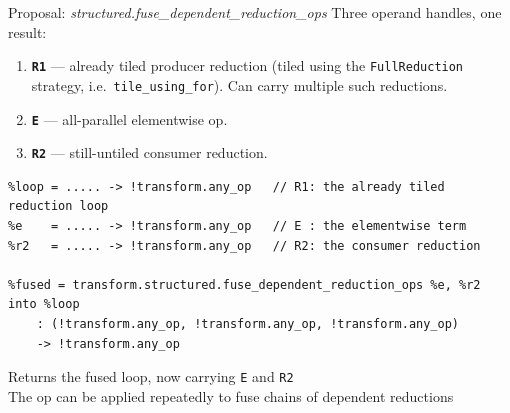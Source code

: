 \documentclass[10pt, aspectratio=169]{beamer}
\newcommand{\code}[1]{\texttt{\small #1}}
\newcommand{\takeawaybox}[2][inteltitle!12]{%
  \colorbox{#1}{%
    \parbox{\dimexpr\textwidth-2\fboxsep\relax}{\centering\vspace{1mm}
      #2\vspace{1mm}}}}
\newcommand{\takeaway}[1]{\par\vspace{2mm}\noindent\takeawaybox{#1}\par\vspace{2.5mm}}
\begin{document}
\begin{frame}[fragile]{Proposal: \textit{structured.fuse\_dependent\_reduction\_ops}}
  Three operand handles, one result:
  \begin{enumerate}\small
    \item \textbf{\code{R1}} --- already tiled producer reduction (tiled using
      the \code{FullReduction} strategy, i.e.\ \code{tile\_using\_for}). Can carry multiple such reductions.
    \item \textbf{\code{E}} --- all-parallel elementwise op.
    \item \textbf{\code{R2}} --- still-untiled consumer reduction.
  \end{enumerate}
\begin{lstlisting}
%loop = ..... -> !transform.any_op   // R1: the already tiled reduction loop
%e    = ..... -> !transform.any_op   // E : the elementwise term
%r2   = ..... -> !transform.any_op   // R2: the consumer reduction

%fused = transform.structured.fuse_dependent_reduction_ops %e, %r2 into %loop
    : (!transform.any_op, !transform.any_op, !transform.any_op)
    -> !transform.any_op
\end{lstlisting}
  \takeaway{Returns the fused loop, now carrying \code{E} and \code{R2}\\
    The op can be applied repeatedly to fuse chains of dependent reductions}
\end{frame}
\end{document}
